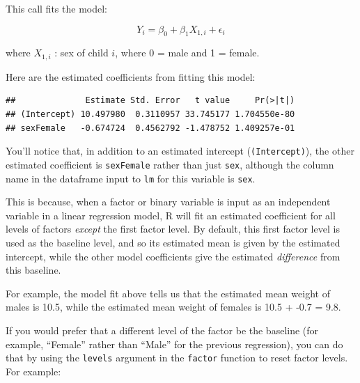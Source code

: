 \documentclass[]{book}
\makeatletter
\newenvironment{Shaded}{\begin{snugshade}}{\end{snugshade}}
\newcommand{\KeywordTok}[1]{\textcolor[rgb]{0.13,0.29,0.53}{\textbf{#1}}}
\newcommand{\DataTypeTok}[1]{\textcolor[rgb]{0.13,0.29,0.53}{#1}}
\newcommand{\StringTok}[1]{\textcolor[rgb]{0.31,0.60,0.02}{#1}}
\newcommand{\OperatorTok}[1]{\textcolor[rgb]{0.81,0.36,0.00}{\textbf{#1}}}
\newcommand{\NormalTok}[1]{#1}
\newenvironment{kframe}{%
\medskip{}
\setlength{\fboxsep}{.8em}
 \def\at@end@of@kframe{}%
 \ifinner\ifhmode%
  \def\at@end@of@kframe{\end{minipage}}%
  \begin{minipage}{\columnwidth}%
 \fi\fi%
 \def\FrameCommand##1{\hskip\@totalleftmargin \hskip-\fboxsep
 \colorbox{shadecolor}{##1}\hskip-\fboxsep
     \hskip-\linewidth \hskip-\@totalleftmargin \hskip\columnwidth}%
 \MakeFramed {\advance\hsize-\width
   \@totalleftmargin\z@ \linewidth\hsize
   \@setminipage}}%
 {\par\unskip\endMakeFramed%
 \at@end@of@kframe}
\renewenvironment{Shaded}{\begin{kframe}}{\end{kframe}}
\theoremstyle{definition}
\theoremstyle{definition}
\theoremstyle{definition}
\theoremstyle{remark}
\makeatother
\begin{document}
This call fits the model:

\[ Y_{i} = \beta_{0} + \beta_{1}X_{1,i} + \epsilon_{i} \]

where \(X_{1,i}\) : sex of child \(i\), where 0 = male and 1 = female.

Here are the estimated coefficients from fitting this model:

\begin{Shaded}
\end{Shaded}

\begin{verbatim}
##              Estimate Std. Error   t value     Pr(>|t|)
## (Intercept) 10.497980  0.3110957 33.745177 1.704550e-80
## sexFemale   -0.674724  0.4562792 -1.478752 1.409257e-01
\end{verbatim}

You'll notice that, in addition to an estimated intercept
(\texttt{(Intercept)}), the other estimated coefficient is
\texttt{sexFemale} rather than just \texttt{sex}, although the column
name in the dataframe input to \texttt{lm} for this variable is
\texttt{sex}.

This is because, when a factor or binary variable is input as an
independent variable in a linear regression model, R will fit an
estimated coefficient for all levels of factors \emph{except} the first
factor level. By default, this first factor level is used as the
baseline level, and so its estimated mean is given by the estimated
intercept, while the other model coefficients give the estimated
\emph{difference} from this baseline.

For example, the model fit above tells us that the estimated mean weight
of males is 10.5, while the estimated mean weight of females is 10.5 +
-0.7 = 9.8.

If you would prefer that a different level of the factor be the baseline
(for example, ``Female'' rather than ``Male'' for the previous
regression), you can do that by using the \texttt{levels} argument in
the \texttt{factor} function to reset factor levels. For example:

\begin{Shaded}
\end{Shaded}
\end{document}
